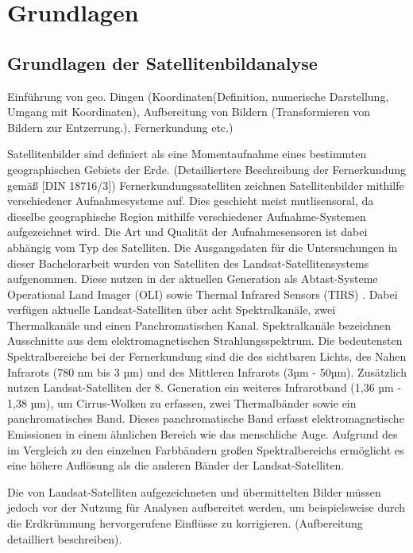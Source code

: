 
\chapter{Grundlagen}
\section{Grundlagen der Satellitenbildanalyse}
Einführung von geo. Dingen (Koordinaten(Definition, numerische Darstellung, Umgang mit Koordinaten), Aufbereitung von Bildern (Transformieren von Bildern zur Entzerrung.), Fernerkundung etc.)

Satellitenbilder sind definiert als eine Momentaufnahme eines bestimmten geographischen Gebiets der Erde. (Detailliertere Beschreibung der Fernerkundung gemäß [DIN 18716/3]) Fernerkundungssatelliten zeichnen Satellitenbilder mithilfe verschiedener Aufnahmesysteme auf. Dies geschieht meist mutlisensoral, da dieselbe geographische Region mithilfe verschiedener Aufnahme-Systemen aufgezeichnet wird. Die Art und Qualität der Aufnahmesensoren ist dabei abhängig vom Typ des Satelliten. Die Ausgangsdaten für die Untersuchungen in dieser Bachelorarbeit wurden von Satelliten des Landsat-Satellitensystems aufgenommen. Diese nutzen in der aktuellen Generation als Abtast-Systeme Operational Land Imager (OLI) \cite{Markham2004} sowie Thermal Infrared Sensors (TIRS) \cite{Chaudhary2011}. Dabei verfügen aktuelle Landsat-Satelliten über acht Spektralkanäle, zwei Thermalkanäle und einen Panchromatischen Kanal. Spektralkanäle bezeichnen Ausschnitte aus dem elektromagnetischen Strahlungsspektrum. Die bedeutensten Spektralbereiche bei der Fernerkundung sind die des sichtbaren Lichts, des Nahen Infrarots (780 nm bis 3 µm) und des Mittleren Infrarots (3µm - 50µm). Zusätzlich nutzen Landsat-Satelliten der 8. Generation ein weiteres Infrarotband (1,36 µm - 1,38 µm), um Cirrus-Wolken zu erfassen, zwei Thermalbänder sowie ein panchromatisches Band. Dieses panchromatische Band erfasst elektromagnetische Emissionen in einem ähnlichen Bereich wie das menschliche Auge. Aufgrund des im Vergleich zu den einzelnen Farbbändern großen Spektralbereichs ermöglicht es eine höhere Auflösung als die anderen Bänder der Landsat-Satelliten.

Die von Landsat-Satelliten aufgezeichneten und übermittelten Bilder müssen jedoch vor der Nutzung für Analysen aufbereitet werden, um beispielsweise durch die Erdkrümmung hervorgerufene Einflüsse zu korrigieren. (Aufbereitung detailliert beschreiben).
 
